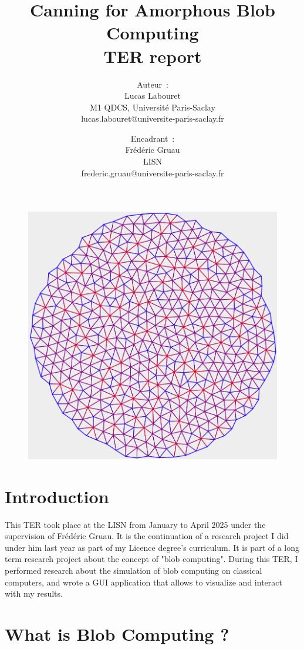 \documentclass{article}
\title{
	Canning for Amorphous Blob Computing\\
	\small TER report
}
\author{
    Auteur~:\\
    Lucas Labouret\\
    M1 QDCS, Université Paris-Saclay\\
    \small lucas.labouret@universite-paris-saclay.fr
    \and
    Encadrant~:\\
    Frédéric Gruau\\
    LISN\\
    \small frederic.gruau@universite-paris-saclay.fr
}
\date{}
\begin{document}
 
\maketitle

\begin{figure}[H]
	\centering\includegraphics[width=0.9\linewidth]{assets/Circle500.png}
\end{figure}

\newpage
\tableofcontents
\newpage

\renewcommand{\thesection}{\Alph{section}}

\section*{Introduction}
\label{introduction}

This TER took place at the LISN from January to April 2025 under the supervision of Frédéric Gruau. It is the continuation of a research project I did under him last year as part of my Licence degree's curriculum. It is part of a long term research project about the concept of "blob computing"\supercite{blob_computing1}. During this TER, I performed research about the simulation of blob computing on classical computers, and wrote a GUI application that allows to visualize and interact with my results.

\section{What is Blob Computing ?}
\end{document}
